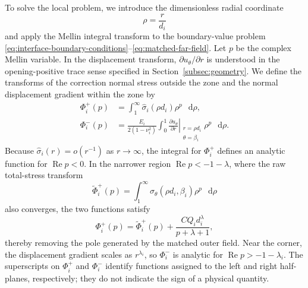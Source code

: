 \documentclass[pdflatex,onecolumn,sn-mathphys-ay]{sn-jnl}
\newcommand{\dd}{\mathop{}\!\mathrm{d}}
\begin{document}
To solve the local problem, we introduce the dimensionless radial coordinate
\begin{equation*}
  \rho=\frac{r}{d_i}
\end{equation*}
and apply the Mellin integral transform to the boundary-value problem
\eqref{eq:interface-boundary-conditions}--\eqref{eq:matched-far-field}.
Let $p$ be the complex Mellin variable. In the displacement transform,
$\partial u_\theta/\partial r$ is understood in the opening-positive trace
sense specified in Section~\ref{subsec:geometry}. We define the transforms
of the correction normal stress outside the zone and the normal displacement
gradient within the zone by
\begin{equation*}
\begin{aligned}
  \Phi_i^+(p)
    &=\int_1^\infty
      \widehat{\sigma}_i(\rho d_i)\rho^p\,\dd\rho,\\
  \Phi_i^-(p)
    &=\frac{E_i}{2(1-\nu_i^2)}
      \int_0^1
      \left.
      \frac{\partial u_\theta}{\partial r}
      \right|_{\substack{r=\rho d_i\\\theta=\beta_i}}
      \rho^p\,\dd\rho.
\end{aligned}
\end{equation*}
Because $\widehat{\sigma}_i(r)=o(r^{-1})$ as $r\to\infty$, the integral
for $\Phi_i^+$ defines an analytic function for
$\operatorname{Re}p<0$. In the narrower region
$\operatorname{Re}p<-1-\lambda$, where the raw total-stress transform
\begin{equation*}
  \widetilde{\Phi}_i^+(p)
  =\int_1^\infty
    \sigma_\theta(\rho d_i,\beta_i)\rho^p\,\dd\rho
\end{equation*}
also converges, the two functions satisfy
\begin{equation*}
  \Phi_i^+(p)
  =\widetilde{\Phi}_i^+(p)
   +\frac{CQ_i d_i^\lambda}{p+\lambda+1},
\end{equation*}
thereby removing the pole generated by the matched outer field. Near the
corner, the displacement gradient scales as $r^{\lambda_i}$, so
$\Phi_i^-$ is analytic for $\operatorname{Re}p>-1-\lambda_i$. The superscripts on $\Phi_i^+$ and
$\Phi_i^-$ identify functions assigned to the left and right half-planes,
respectively; they do not indicate the sign of a physical quantity.
\end{document}
